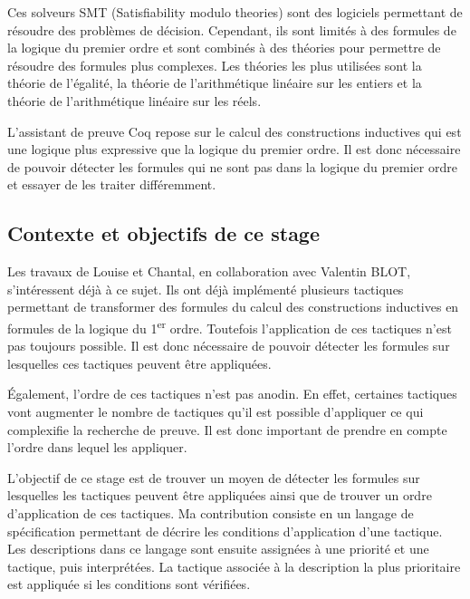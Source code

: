 \documentclass[titlepage,draft]{article}
\begin{document}
Ces solveurs SMT (Satisfiability modulo theories) sont des logiciels permettant de résoudre des problèmes de décision. Cependant, ils sont limités à des formules de la logique du premier ordre et sont combinés à des théories pour permettre de résoudre des formules plus complexes. Les théories les plus utilisées sont la théorie de l'égalité, la théorie de l'arithmétique linéaire sur les entiers et la théorie de l'arithmétique linéaire sur les réels.

L'assistant de preuve Coq repose sur le calcul des constructions inductives qui est une logique plus expressive que la logique du premier ordre. Il est donc nécessaire de pouvoir détecter les formules qui ne sont pas dans la logique du premier ordre et essayer de les traiter différemment.

\subsection{Contexte et objectifs de ce stage}
Les travaux de Louise et Chantal, en collaboration avec Valentin BLOT, s'intéressent déjà à ce sujet. Ils ont déjà implémenté plusieurs tactiques permettant de transformer des formules du calcul des constructions inductives en formules de la logique du 1\textsuperscript{er} ordre. Toutefois l'application de ces tactiques n'est pas toujours possible. Il est donc nécessaire de pouvoir détecter les formules sur lesquelles ces tactiques peuvent être appliquées.

Également, l'ordre de ces tactiques n'est pas anodin. En effet, certaines tactiques vont augmenter le nombre de tactiques qu'il est possible d'appliquer ce qui complexifie la recherche de preuve. Il est donc important de prendre en compte l'ordre dans lequel les appliquer.

L'objectif de ce stage est de trouver un moyen de détecter les formules sur lesquelles les tactiques peuvent être appliquées ainsi que de trouver un ordre d'application de ces tactiques.
Ma contribution consiste en un langage de spécification permettant de décrire les conditions d'application d'une tactique. Les descriptions dans ce langage sont ensuite assignées à une priorité et une tactique, puis interprétées. La tactique associée à la description la plus prioritaire est appliquée si les conditions sont vérifiées.
\end{document}
